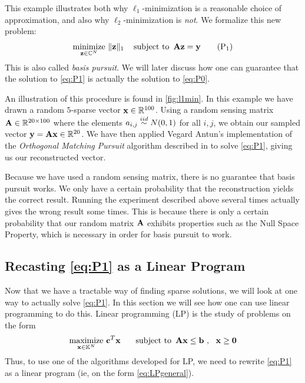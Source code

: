 This example illustrates both why $ \ell_{1} $-minimization is a reasonable choice of approximation, and also why $ \ell_{2} $-minimization is \textit{not}. We formalize this new problem:
\begin{equation}
	\underset{\mathbf{z} \in \mathbb{C}^{N}}{\text{minimize}}~ \lVert\mathbf{z}\rVert_1
	\quad\operatorname*{subject~to}~ \mathbf{A}\mathbf{z} = \mathbf{y}
	\tag{P$_1$}
	\label{eq:P1}
\end{equation}
This is also called \textit{basis pursuit}. We will later discuss how one can guarantee that the solution to \eqref{eq:P1} is actually the solution to \eqref{eq:P0}.

An illustration of this procedure is found in \cref{fig:l1min}. In this example we have drawn a random $ 5 $-sparse vector $ \mathbf{x} \in \mathbb{R}^{100} $. Using a random sensing matrix $ \mathbf{A} \in \mathbb{R}^{20\times 100} $ where the elements $ a_{i,j} \stackrel{iid}{\sim} N(0, 1) $ for all $ i,j $,  we obtain our sampled vector $ \mathbf{y} = \mathbf{A}\mathbf{x} \in\mathbb{R}^{20} $. We have then applied Vegard Antun's implementation of the \textit{Orthogonal Matching Pursuit} algorithm described in \cite[Section~3.2]{foucart13intro} to solve \eqref{eq:P1}, giving us our reconstructed vector.\nocite{antunAlgs}

Because we have used a random sensing matrix, there is no guarantee that basis pursuit works. We only have a certain probability that the reconstruction yields the correct result. Running the experiment described above several times actually gives the wrong result some times. This is because there is only a certain probability that our random matrix $ \mathbf{A} $ exhibits properties such as the Null Space Property, which is necessary in order for basis pursuit to work. 






\subsection{Recasting \eqref{eq:P1} as a Linear Program} \label{sec:basisasLP}
Now that we have a tractable way of finding sparse solutions, we will look at one way to actually solve \eqref{eq:P1}. In this section we will see how one can use linear programming to do this. Linear programming (LP) is the study of problems on the form
\begin{equation}
	\underset{\mathbf{x}\in\mathbb{K}^{N}}{\text{maximize}}~ \mathbf{c}^{T}\mathbf{x} ~~ \quad\operatorname*{subject~to}~ \mathbf{A}\mathbf{x}\leq\mathbf{b}~,~~ \mathbf{x}\geq\mathbf{0}
	\label{eq:LPgeneral}
\end{equation}
Thus, to use one of the algorithms developed for LP, we need to rewrite \eqref{eq:P1} as a linear program (ie, on the form \eqref{eq:LPgeneral}). 

